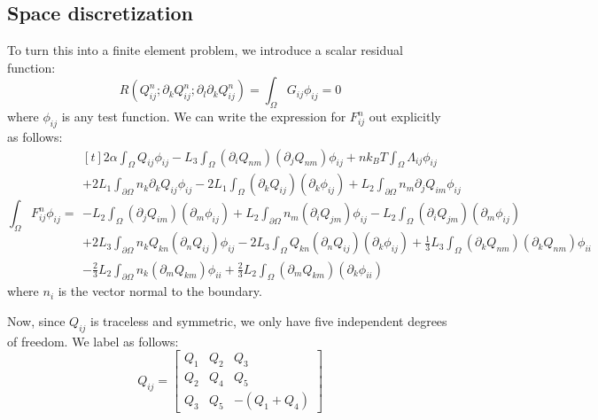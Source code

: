 \documentclass[reqno]{article}
\begin{document}
	\subsection{Space discretization}
	To turn this into a finite element problem, we introduce a scalar residual function:
	\begin{equation}
		R \left(Q^n_{ij} ; \partial_k Q^n_{ij} ; \partial_l \partial_k Q^n_{ij}\right)
		= \int_\Omega G_{ij} \phi_{ij}
		= 0
	\end{equation}
	where $\phi_{ij}$ is any test function.
	We can write the expression for $F^n_{ij}$ out explicitly as follows:
	\begin{equation}
		\int_\Omega F^n_{ij} \phi_{ij}
		=
		\begin{multlined}[t]
			2 \alpha \int_\Omega Q_{ij} \phi_{ij}
			- L_3 \int_\Omega (\partial_i Q_{nm})(\partial_j Q_{nm}) \phi_{ij}
			+ n k_B T \int_\Omega \Lambda_{ij} \phi_{ij} \\
			+ 2 L_1 \int_{\partial \Omega} n_k \partial_k Q_{ij} \phi_{ij}
			- 2 L_1 \int_{\Omega} (\partial_k Q_{ij})(\partial_k \phi_{ij}) 
			+ L_2 \int_{\partial \Omega} n_m \partial_j Q_{im} \phi_{ij} \\
			- L_2 \int_\Omega (\partial_j Q_{im}) (\partial_m \phi_{ij}) 
			+ L_2 \int_{\partial \Omega} n_m (\partial_i Q_{jm}) \phi_{ij}
			- L_2 \int_\Omega (\partial_i Q_{jm}) (\partial_m \phi_{ij}) \\
			+ 2 L_3 \int_{\partial \Omega} n_k Q_{kn} (\partial_n Q_{ij}) \phi_{ij} 
			- 2 L_3 \int_\Omega Q_{kn} (\partial_n Q_{ij}) (\partial_k \phi_{ij})
			+ \tfrac13 L_3 \int_\Omega (\partial_k Q_{nm}) (\partial_k Q_{nm}) \phi_{ii} \\
			- \tfrac23 L_2 \int_{\partial \Omega} n_k (\partial_m Q_{km}) \phi_{ii}
			+ \tfrac23 L_2 \int_\Omega (\partial_m Q_{km}) (\partial_k \phi_{ii})
		\end{multlined}
	\end{equation}
	where $n_i$ is the vector normal to the boundary.
	
	Now, since $Q_{ij}$ is traceless and symmetric, we only have five independent degrees of freedom.
	We label as follows:
	\begin{equation}
	Q_{ij}
	= \begin{bmatrix}
	Q_1 & Q_2 & Q_3 \\
	Q_2 & Q_4 & Q_5 \\
	Q_3 & Q_5 & -(Q_1 + Q_4)
	\end{bmatrix}
	\end{equation}
	
\end{document}
